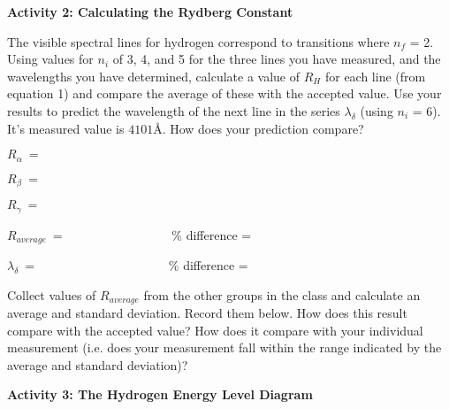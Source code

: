 \vspace{0.5in}

\textbf{Activity 2: Calculating the Rydberg Constant}

 
The visible spectral lines for hydrogen correspond to transitions where $n_f$ = 2.  Using values for $n_i$ of 3, 4, and 5 for the three lines you have measured, and the wavelengths you have determined, calculate a value of $R_H$ for each line (from equation 1) and compare the average of these with the accepted value.  
Use your results to predict the wavelength of the next line in the series $\lambda_\delta$ (using $n_i$ = 6). It's measured value is $4101${\AA}.  
How does your prediction compare?     

\noindent $R_\alpha ~ = ~\qquad\qquad\qquad\qquad\qquad$

\vspace{0.4in}

\noindent $R_\beta ~ = ~\qquad\qquad\qquad\qquad\qquad$

\vspace{0.4in}

\noindent $R_\gamma ~ =~ \qquad\qquad\qquad\qquad\qquad$

\vspace{0.4in}

\noindent $R_{average} ~ =~ \qquad\qquad\qquad\qquad$  \% difference = 

\vspace{0.4in}

\noindent $\lambda_\delta ~ = ~\qquad\qquad\qquad\qquad\qquad$  \% difference =

\vspace{0.2in}


Collect values of $R_{average}$ from the other groups in the class and calculate 
an average and standard deviation. Record them below.
How does this result compare with the accepted value?
How does it compare with your individual measurement (i.e. does your 
measurement fall within the range indicated by the average and standard 
deviation)?

\vspace{1.0in}

\textbf{Activity 3: The Hydrogen Energy Level Diagram}

